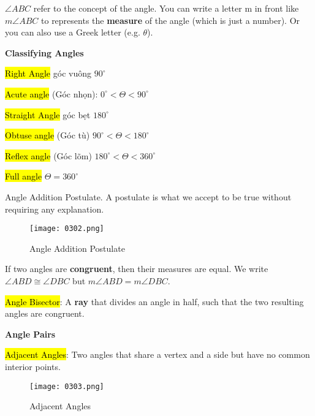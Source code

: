 $\angle ABC$ refer to the concept of the angle. You can write a letter m in front like $m\angle ABC$ to represents the \textbf{measure} of the angle (which is just a number). Or you can also use a Greek letter (e.g. $\theta$).

\vspace{1 cm}

\centerline{\textbf{\huge Classifying Angles}}

\vspace{0.2 cm}

\hl{Right Angle} góc vuông $90^{\circ}$

\hl{Acute angle} (Góc nhọn): $0^{\circ} < \Theta < 90^{\circ}$

\hl{Straight Angle} góc bẹt $180^{\circ}$

\hl{Obtuse angle} (Góc tù) $90^{\circ} < \Theta < 180^{\circ}$

\hl{Reflex angle} (Góc lõm) $180^{\circ} < \Theta < 360^{\circ}$

\hl{Full angle} $\Theta = 360^{\circ}$

\newpage

Angle Addition Postulate. A postulate is what we accept to be true without requiring any explanation.

\begin{figure}[htb!]
  \centering
  \texttt{[image: 0302.png]}
  \caption{Angle Addition Postulate}
\end{figure}

If two angles are \textbf{congruent}, then their measures are equal. We write $\angle ABD \cong \angle DBC$ but $m\angle ABD = m\angle DBC$.

\hl{Angle Bisector}: A \textbf{ray} that divides an angle in half, such that the two resulting angles are congruent.

\vspace{0.9 cm}

\centerline{\textbf{\huge Angle Pairs}}

\vspace{0.2 cm}

\hl{Adjacent Angles}: Two angles that share a vertex and a side but have no common interior points.

\begin{figure}[htb!]
  \centering
  \texttt{[image: 0303.png]}
  \caption{Adjacent Angles}
\end{figure}

\newpage

